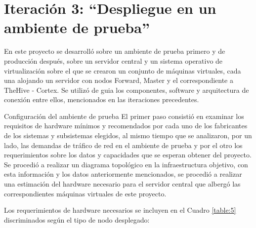 \chapter{Iteración 3: “Despliegue en un ambiente de prueba”}
    En este proyecto se desarrolló sobre un ambiente de prueba primero y de producción después, sobre un servidor central y un sistema operativo de virtualización sobre el que se crearon un conjunto de máquinas virtuales, cada una alojando un servidor con nodos Forward, Master y el correspondiente a TheHive - Cortex. Se utilizó de guia los componentes, software y arquitectura de conexión entre ellos, mencionados en las iteraciones precedentes.
    
    \begin{section}{Configuración del ambiente de prueba} %
        El primer paso consistió en examinar los requisitos de hardware mínimos y recomendados por cada uno de los fabricantes de los sistemas y subsistemas elegidos, al mismo tiempo que se analizaron, por un lado, las demandas de tráfico de red en el ambiente de prueba y por el otro los requerimientos sobre los datos y capacidades que se esperan obtener del proyecto. Se procedió a realizar un diagrama topológico en la infraestructura objetivo, con esta información y los datos anteriormente mencionados, se procedió a realizar una estimación del hardware necesario para el servidor central que albergó las correspondientes máquinas virtuales de este proyecto.\par
    	Los requerimientos de hardware necesarios se incluyen en el Cuadro \ref{table:5} discriminados según el tipo de nodo desplegado:
        \begin{table}[H]
        \centering
        \begin{tabular}{|m{9em}|m{9em}|m{9em}|m{9em}|}
        

\end{tabular}
\end{table}
\end{section}
